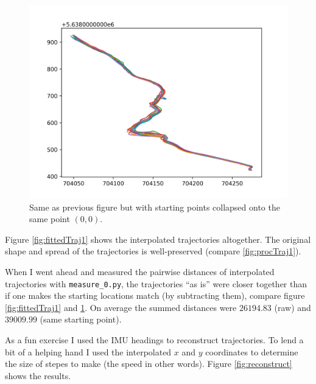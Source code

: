 \documentclass[a4]{article}
\begin{document}
\begin{figure}
  \includegraphics[width=\textwidth]{figures/fitted_trajectories_onepanel.png}
  \caption{\label{fig:fittedTraj2} Same as previous figure but with
    starting points collapsed onto the same point $(0,0)$.
    }
\end{figure}

Figure \ref{fig:fittedTraj1} shows the interpolated trajectories
altogether. The original shape and spread of the trajectories is
well-preserved (compare \ref{fig:procTraj1}).


When I went ahead and measured the pairwise distances of interpolated
trajectories with \verb+measure_0.py+, the trajectories ``as is'' were
closer together than if one makes the starting locations match (by
subtracting them), compare figure \ref{fig:fittedTraj1} and \ref{fig:fittedTraj2}. On average the summed distances were $26194.83$ (raw)
and $39009.99$ (same starting point).

As a fun exercise I used the IMU headings to reconstruct
trajectories. To lend a bit of a helping hand I used the interpolated
$x$ and $y$ coordinates to determine the size of stepes to make (the
speed in other words). Figure \ref{fig:reconstruct} shows the results.
\end{document}
